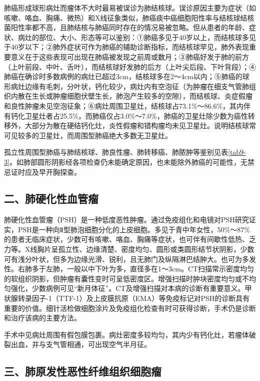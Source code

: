 肺癌形成球形病灶而瘤体不大时最易被误诊为肺结核球。误诊原因主要为症状（如咳嗽、咯血、胸痛、微热）和X线征象类似，肺癌痰中癌细胞阳性率与结核球结核菌阳性率都不高，且肺结核与肺癌同时存在的情况易被忽略。但从患者的年龄、症状、病灶的部位、大小、形态等可以鉴别：①肺癌多见于40岁以上，而结核球多见于40岁以下；②肺外症状可作为肺癌的辅助诊断指标，而结核球罕见，肺外表现重要意义在于这些表现可出现在肺癌被发现之前周或数月；③肺癌好发于肺的前方（上叶前段、中叶、舌叶），而结核球好发肺的后方（上叶尖后段、下叶背段）；④肺癌在确诊时多数病例的病灶已超过3cm，结核球多在2～4cm以内；⑤肺癌的球形病灶边缘有毛刺，分叶状，钙化较少，病灶内有空泡征（为肿瘤在细支气管肺组织内散在生长或肿瘤细胞伏壁生长，肺泡产生较多的空隙），而结核球、炎症假瘤和良性肿瘤未见空泡征象；⑥病灶周围卫星灶，结核球占73.1\%～86.6\%，其内伴有钙化卫星灶者占25.5\%，而肺癌仅占3.0\%～7.0\%，肺癌的卫星灶除少数为癌性转移外，大部分为散在硬结钙化灶，炎性假瘤和错构瘤均未见卫星灶。说明结核球常可见较多的卫星灶，而周围型肺癌绝大多数无卫星灶。

孤立性周围型肺癌与肺结核球、肺良性瘤、肺转移癌、肺脓肿等鉴别见表\ref{tab9-3}。如肺部圆形阴影经各项检查仍未能确定原因，也未能除外肺癌的可能性，无禁忌证时应及早开胸探查。

\subsection{二、肺硬化性血管瘤}

肺硬化性血管瘤（PSH）是一种低度恶性肿瘤。通过免疫组化和电镜对PSH研究证实，PSH是一种向Ⅱ型肺泡细胞分化的上皮细胞。多见于青中年女性，50\%～87\%的患者无临床症状，少数可有咳嗽、咯血、胸痛等症状，也可伴有间歇性低热、乏力等。X线胸片呈孤立性、边缘清楚、密度均匀、圆形或类圆形结节状阴影，少数可有浅分叶状，但多为边缘光滑、锐利，且无肺门及纵隔淋巴结肿大。也可为多发性。右肺多于左肺，一般以中下叶为多，直径多在1～3cm。CT扫描常示密度均匀的软组织阴影，但肿瘤有囊性变时可呈低密度区。增强扫描时肿块密度均匀或不均匀强化，少数病例可见“新月体征”。CT及增强扫描对本病的诊断有重要意义。甲状腺转录因子-1（TTF-1）及上皮膜抗原（EMA）等免疫标记对PSH的诊断具有重要的价值。细针活检做细胞涂片及免疫组化检查有时可获得诊断，手术仍是诊断和治疗该病的主要方法。

手术中见病灶周围有假包膜包裹。病灶密度多较均匀，其内少有钙化灶，若瘤体破裂出血，并与支气管相通，可出现空气半月征。

\subsection{三、肺原发性恶性纤维组织细胞瘤}

